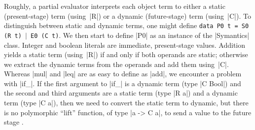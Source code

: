 Roughly, a partial evaluator interprets each object term to either
a static (present-stage) term (using~|R|) or
a dynamic (future-stage) term (using~|C|).  To
distinguish between static and dynamic terms, one might define
\texttt{data P0 t = S0 (R t) $\mid$ E0 (C t)}.
We then start to define |P0| as an instance of the |Symantics| class.
Integer and boolean literals are immediate, present-stage
values. Addition yields a static term (using~|R|) if and only if both operands
are static; otherwise we extract the dynamic terms from the operands and
add them using~|C|.
Whereas |mul| and |leq| are as easy to define as |add|, we encounter
a problem with |if_|.  If the first argument to |if_| is a dynamic term
(type |C Bool|) and the second and third arguments are a static term
(type |R a|) and a dynamic term (type |C a|), then we need to convert
the static term to dynamic, but there is no polymorphic ``lift''
function, of type |a -> C a|, to send a value to the future stage
\cite{xi-guarded,WalidPOPL03}.
\begin{comment}
\begin{code}
data P0 t = S0 (R t) | E0 (C t)
\end{code}
To extract a dynamic term from this type, we create the functions
\begin{code}
abstrI :: P0 Int -> C Int
abstrI (S0 r) = int (unR r)
abstrI (E0 c) = c

abstrB :: P0 Bool -> C Bool
abstrB (S0 r) = bool (unR r)
abstrB (E0 c) = c
\end{code}
We then start to define |P0| as an instance of the |Symantics| class.
\begin{code}
instance Symantics P0 where
  int  x = S0 (int x)
  bool x = S0 (bool x)
  add (S0 e1) (S0 e2) = S0 (add e1 e2)
  add e1 e2 = E0 (add (abstrI e1) (abstrI e2))
\end{code}
Integer and boolean literals are immediate, present-stage
values. Addition yields a static term (using~|R|) if and only if both operands
are static; otherwise we extract the dynamic terms from the operands and
add them using~|C|.  Thus the two uses of |add| above refer to
|add| for~|R| and |add| for~|C|.

Whereas |mul| and |leq| are as easy to define as |add|, we encounter
a problem with |if_|.  If the first argument to |if_| is a dynamic term
(type |C Bool|) and the second and third arguments are a static term
(type |R a|) and a dynamic term (type |C a|), then we need to convert
the static term to dynamic, but there is no polymorphic ``lift''
function, of type |a -> C a|, to send a value to the future stage
\cite{xi-guarded,WalidPOPL03}.\footnote{We note in passing that, if we
were to add polymorphic \texttt{lift} to the type class
\texttt{Symantics repr}, then \texttt{repr} would become an instance of
\texttt{Applicative} and thus \texttt{Functor}:\quad\texttt{fmap
f = app (lift f)}}
\end{comment}

